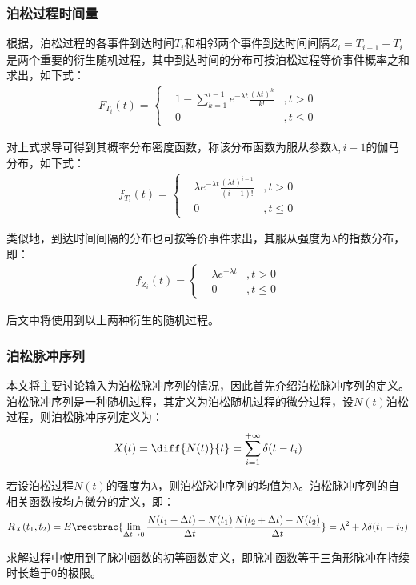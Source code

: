 \documentclass[11pt]{article}
\begin{document}
\subsubsection{泊松过程时间量}
根据\cite{ZhouYinQingSuiJiGuoChengLiLun2013}，泊松过程的各事件到达时间$T_i$和相邻两个事件到达时间间隔$Z_i=T_{i+1}-T_i$是两个重要的衍生随机过程，其中到达时间的分布可按泊松过程等价事件概率之和求出，如下式：
\begin{align}
  F_{T_i}(t)=\left\{
  \begin{aligned}
     & 1-\sum\limits_{k=1}^{i-1}e^{-\lambda t}\frac{(\lambda t)^k}{k!} & , t>0    \\
     & 0                                                               & , t\le 0
  \end{aligned}
  \right.
  \label{eq:到达时间概率分布函数}
\end{align}\par
对上式求导可得到其概率分布密度函数，称该分布函数为服从参数$\lambda,i-1$的伽马分布，如下式：
\begin{align}
  f_{T_i}(t)=\left\{
  \begin{aligned}
     & \lambda e^{-\lambda t}\frac{(\lambda t)^{i-1}}{(i-1)!} & ,t>0     \\
     & 0                                                      & , t\le 0
  \end{aligned}
  \right.
  \label{eq:到达时间概率密度函数}
\end{align}\par
类似地，到达时间间隔的分布也可按等价事件求出，其服从强度为$\lambda$的指数分布，即：
\begin{align}
  f_{Z_i}(t)=\left\{
  \begin{aligned}
     & \lambda e^{-\lambda t} & ,t>0    \\
     & 0                      & ,t\le 0
  \end{aligned}
  \right.
  \label{eq:到达时间间隔概率密度函数}
\end{align}\par
后文中将使用到以上两种衍生的随机过程。
\subsubsection{泊松脉冲序列}
本文将主要讨论输入为泊松脉冲序列的情况，因此首先介绍泊松脉冲序列的定义。泊松脉冲序列是一种随机过程，其定义为泊松随机过程的微分过程\cite{ZhouYinQingSuiJiGuoChengLiLun2013}，设$N(t)$泊松过程，则泊松脉冲序列定义为：
\begin{align}
  X(t)=\diff{N(t)}{t}=\sum\limits_{i=1}^{+\infty}\delta(t-t_i)
  \label{eq:泊松脉冲序列定义}
\end{align}\par
若设泊松过程$N(t)$的强度为$\lambda$，则泊松脉冲序列的均值为$\lambda$。泊松脉冲序列的自相关函数按均方微分的定义，即：
\begin{align}
  R_X(t_1,t_2)=E\rectbrac{\lim_{\Delta t\to 0}\frac{N(t_1+\Delta t)-N(t_1)}{\Delta t}\frac{N(t_2+\Delta t)-N(t_2)}{\Delta t}}=\lambda^2+\lambda\delta(t_1-t_2)
  \label{eq:泊松脉冲序列自相关函数}
\end{align}\par
求解过程中使用到了脉冲函数的初等函数定义，即脉冲函数等于三角形脉冲在持续时长趋于0的极限。
\end{document}
